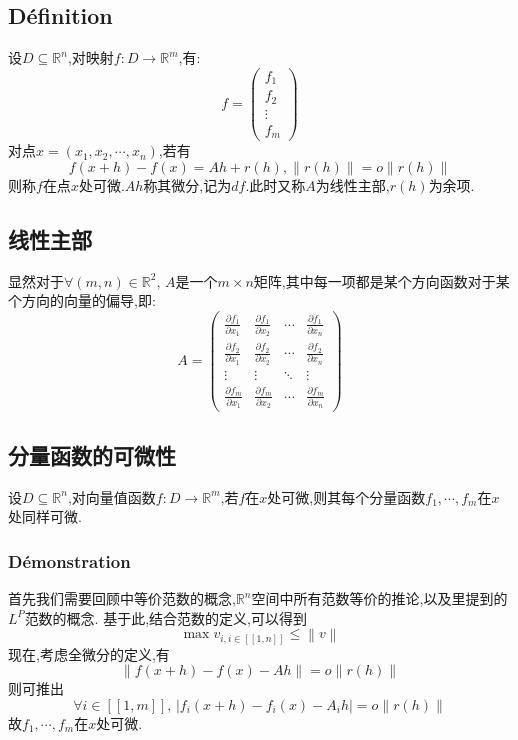 \documentclass[12pt, a4paper, oneside]{ctexbook}
\begin{document}
    \subsection{Définition}
    设$D\subseteq \mathbb{R}^n$,对映射$f:D\rightarrow \mathbb{R}^m$,有:
    $$
    f=\begin{pmatrix}
      f_1\\
      f_2\\
      \vdots\\
     f_m
     \end{pmatrix}
    $$
    对点$x=(x_1,x_2,\cdots,x_n)$,若有
    $$
    f(x+h)-f(x)=Ah+r(h),\left\lVert r(h) \right\rVert =o\left\lVert r(h) \right\rVert 
    $$
    则称$f$在点$x$处可微.$Ah$称其微分,记为$df$.此时又称$A$为线性主部,$r(h)$为余项.
    \subsection{线性主部}
    显然对于$\forall (m,n)\in\mathbb{R}^2$, $A$是一个$m\times n$矩阵,其中每一项都是某个方向函数对于某个方向的向量的偏导,即:
    $$
     A=\begin{pmatrix}
      \frac{\partial f_1}{\partial x_1}&\frac{\partial f_1}{\partial x_2}  &\cdots  &\frac{\partial f_1}{\partial x_n} \\
      \frac{\partial f_2}{\partial x_1}&\frac{\partial f_2}{\partial x_2}  & \cdots & \frac{\partial f_2}{\partial x_n}\\ 
      \vdots& \vdots & \ddots  & \vdots\\
      \frac{\partial f_m}{\partial x_1}&\frac{\partial f_m}{\partial x_2} &\cdots & \frac{\partial f_m}{\partial x_n} 
    \end{pmatrix}
    $$

    \subsection{分量函数的可微性}
    设$D\subseteq \mathbb{R}^n$,对向量值函数$f:D\rightarrow \mathbb{R}^m$,若$f$在$x$处可微,则其每个分量函数$f_1,\cdots,f_m$在$x$处同样可微.
    \subsubsection{Démonstration}
    首先我们需要回顾中等价范数的概念,$\mathbb{R}^n$空间中所有范数等价的推论,以及里提到的$L^P$范数的概念.
    基于此,结合范数的定义,可以得到
    $$
    \max v_{i,i\in[\![1,n]\!] }\leq \left\lVert v\right\rVert 
    $$
    现在,考虑全微分的定义,有
    $$
    \left\lVert f(x+h)-f(x)-Ah\right\rVert =o\left\lVert r(h) \right\rVert 
    $$
    则可推出
    $$
    \forall i \in [\![1,m]\!],\,\left\lvert f_i(x+h)-f_i(x)-A_ih \right\rvert =o\left\lVert r(h) \right\rVert
    $$
    故$f_1,\cdots,f_m$在$x$处可微.
\end{document}
